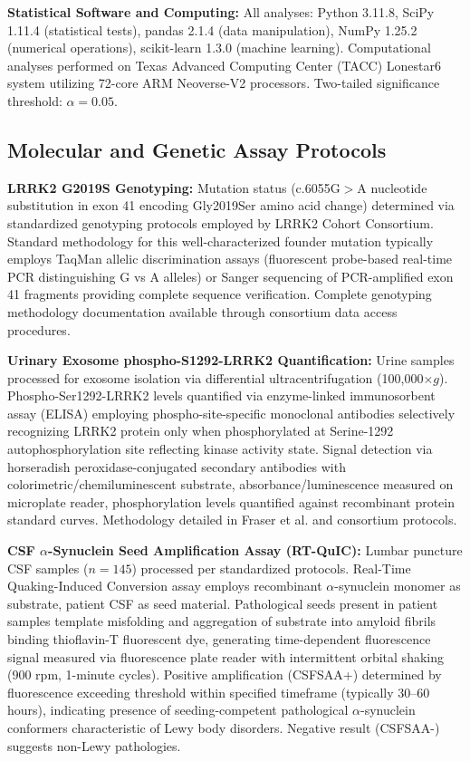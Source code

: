 \documentclass[11pt]{article}
\begin{document}
\textbf{Statistical Software and Computing:} All analyses: Python 3.11.8, SciPy 1.11.4 (statistical tests), pandas 2.1.4 (data manipulation), NumPy 1.25.2 (numerical operations), scikit-learn 1.3.0 (machine learning). Computational analyses performed on Texas Advanced Computing Center (TACC) Lonestar6 system utilizing 72-core ARM Neoverse-V2 processors. Two-tailed significance threshold: $\alpha = 0.05$.

\subsection{Molecular and Genetic Assay Protocols}

\textbf{LRRK2 G2019S Genotyping:} Mutation status (c.6055G$>$A nucleotide substitution in exon 41 encoding Gly2019Ser amino acid change) determined via standardized genotyping protocols employed by LRRK2 Cohort Consortium\cite{marder2015age}. Standard methodology for this well-characterized founder mutation typically employs TaqMan allelic discrimination assays (fluorescent probe-based real-time PCR distinguishing G vs A alleles) or Sanger sequencing of PCR-amplified exon 41 fragments providing complete sequence verification. Complete genotyping methodology documentation available through consortium data access procedures.

\textbf{Urinary Exosome phospho-S1292-LRRK2 Quantification:} Urine samples processed for exosome isolation via differential ultracentrifugation (100,000$\times g$). Phospho-Ser1292-LRRK2 levels quantified via enzyme-linked immunosorbent assay (ELISA) employing phospho-site-specific monoclonal antibodies selectively recognizing LRRK2 protein only when phosphorylated at Serine-1292 autophosphorylation site reflecting kinase activity state. Signal detection via horseradish peroxidase-conjugated secondary antibodies with colorimetric/chemiluminescent substrate, absorbance/luminescence measured on microplate reader, phosphorylation levels quantified against recombinant protein standard curves. Methodology detailed in Fraser et al.\cite{fraser2016ser} and consortium protocols.

\textbf{CSF $\alpha$-Synuclein Seed Amplification Assay (RT-QuIC):} Lumbar puncture CSF samples ($n=145$) processed per standardized protocols\cite{concha2024alpha,siderowf2023csf}. Real-Time Quaking-Induced Conversion assay employs recombinant $\alpha$-synuclein monomer as substrate, patient CSF as seed material. Pathological seeds present in patient samples template misfolding and aggregation of substrate into amyloid fibrils binding thioflavin-T fluorescent dye, generating time-dependent fluorescence signal measured via fluorescence plate reader with intermittent orbital shaking (900 rpm, 1-minute cycles). Positive amplification (CSFSAA+) determined by fluorescence exceeding threshold within specified timeframe (typically 30--60 hours), indicating presence of seeding-competent pathological $\alpha$-synuclein conformers characteristic of Lewy body disorders. Negative result (CSFSAA-) suggests non-Lewy pathologies.
\end{document}
